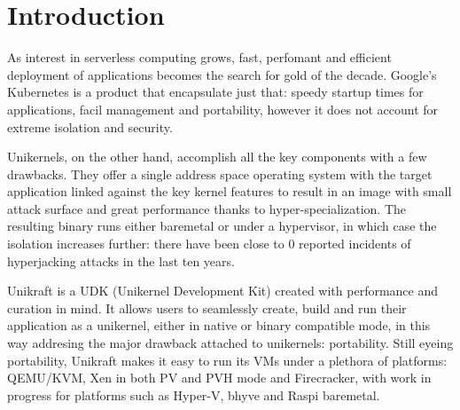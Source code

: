 \chapter{Introduction}
\label{chapter:intro}

As interest in serverless computing grows, fast, perfomant and efficient deployment of applications becomes the search for gold of the decade.
Google's Kubernetes is a product that encapsulate just that: speedy startup times for applications, facil management and portability, however it does not account for extreme isolation and security.

Unikernels, on the other hand, accomplish all the key components with a few drawbacks.
They offer a single address space operating system with the target application linked against the key kernel features to result in an image with small attack surface and great performance thanks to hyper-specialization.
The resulting binary runs either baremetal or under a hypervisor, in which case the isolation increases further: there have been close to 0 reported incidents of hyperjacking attacks in the last ten years.

Unikraft is a UDK (Unikernel Development Kit) created with performance and curation in mind.
It allows users to seamlessly create, build and run their application as a unikernel, either in native or binary compatible mode, in this way addresing the major drawback attached to unikernels: portability.
Still eyeing portability, Unikraft makes it easy to run its VMs under a plethora of platforms: QEMU/KVM, Xen in both PV and PVH mode and Firecracker, with work in progress for platforms such as Hyper-V, bhyve and Raspi baremetal.
